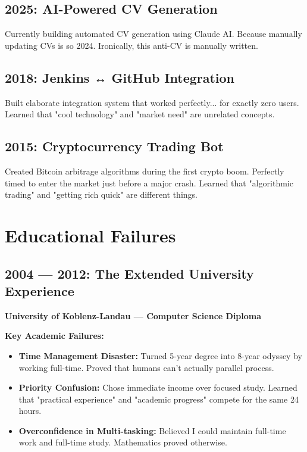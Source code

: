 \documentclass[10pt,a4paper]{article}
\begin{document}
\subsection{2025: AI-Powered CV Generation}
Currently building automated CV generation using Claude AI. Because manually updating CVs is so 2024. Ironically, this anti-CV is manually written.

\subsection{2018: Jenkins ↔ GitHub Integration}
Built elaborate integration system that worked perfectly... for exactly zero users. Learned that "cool technology" and "market need" are unrelated concepts.

\subsection{2015: Cryptocurrency Trading Bot}
Created Bitcoin arbitrage algorithms during the first crypto boom. Perfectly timed to enter the market just before a major crash. Learned that "algorithmic trading" and "getting rich quick" are different things.

\section{Educational Failures}

\subsection{2004 — 2012: The Extended University Experience}
\textbf{University of Koblenz-Landau — Computer Science Diploma}

\textbf{Key Academic Failures:}
\begin{itemize}[leftmargin=1em, itemsep=0.2em]
\item \textbf{Time Management Disaster:} Turned 5-year degree into 8-year odyssey by working full-time. Proved that humans can't actually parallel process.
\item \textbf{Priority Confusion:} Chose immediate income over focused study. Learned that "practical experience" and "academic progress" compete for the same 24 hours.
\item \textbf{Overconfidence in Multi-tasking:} Believed I could maintain full-time work and full-time study. Mathematics proved otherwise.
\end{itemize}
\end{document}
